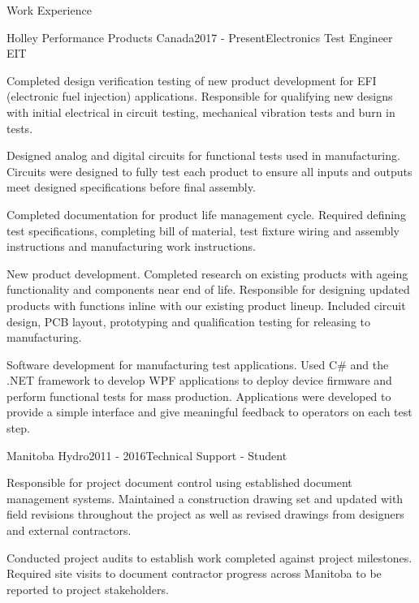 \documentclass{resume} %
\begin{document}
\begin{rSection}{Work Experience}
\begin{rSubsection}{Holley Performance Products Canada}{2017 - Present}{Electronics Test Engineer EIT}{}
    
    \item Completed design verification testing of new product development for EFI (electronic fuel injection) applications. Responsible for qualifying new designs with initial electrical in circuit testing, mechanical vibration tests and burn in tests.

    \item Designed analog and digital circuits for functional tests used in manufacturing. Circuits were designed to fully test each product to ensure all inputs and outputs meet designed specifications before final assembly.
    
    \item Completed documentation for product life management cycle. Required defining test specifications, completing bill of material, test fixture wiring and assembly instructions and manufacturing work instructions.

    \item New product development. Completed research on existing products with ageing functionality and components near end of life. Responsible for designing updated products with functions inline with our existing product lineup. Included circuit design, PCB layout, prototyping and qualification testing for releasing to manufacturing.

    \item Software development for manufacturing test applications. Used C\# and the .NET framework to develop WPF applications to deploy device firmware and perform functional tests for mass production. Applications were developed to provide a simple interface and give meaningful feedback to operators on each test step.
    
\end{rSubsection}

\begin{rSubsection}{Manitoba Hydro}{2011 - 2016}{Technical Support - Student}{}

    \item Responsible for project document control using established document management systems. Maintained a construction drawing set and updated with field revisions throughout the project as well as revised drawings from designers and external contractors. 

    \item Conducted project audits to establish work completed against project milestones. Required site visits to document contractor progress across Manitoba to be reported to project stakeholders.
    
\end{rSubsection}
\end{rSection}
\end{document}
